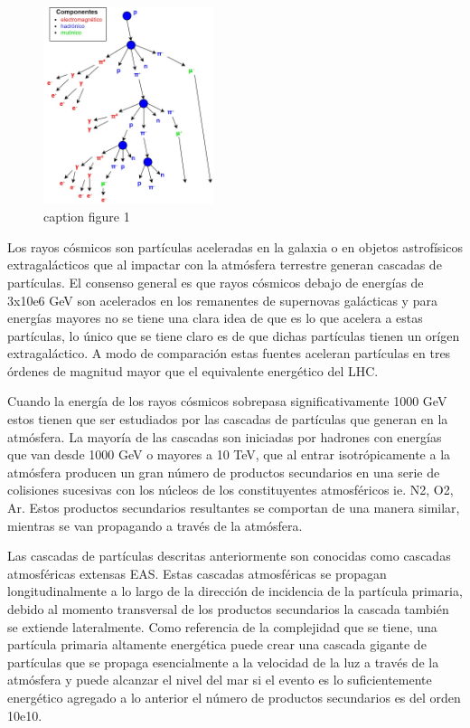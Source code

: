 \begin{figure}
    \centering
    \includegraphics[width=50mm,scale=0.5]{Figures/showercomponents-jpg.jpg}
    \decoRule
    \caption[showercomponents]{caption figure 1}
    \label{fig:showercomponents}
\end{figure}

Los rayos cósmicos son partículas aceleradas en la galaxia o en objetos astrofísicos extragalácticos que al impactar con la atmósfera terrestre generan cascadas de partículas. El consenso general es que rayos cósmicos debajo de energías de 3x10e6 GeV son acelerados en los remanentes de supernovas galácticas y para energías mayores no se tiene una clara idea de que es lo que acelera a estas partículas, lo único que se tiene claro es de que dichas partículas tienen un orígen extragaláctico. A modo de comparación estas fuentes aceleran partículas en tres órdenes de magnitud mayor que el equivalente energético del LHC.

Cuando la energía de los rayos cósmicos sobrepasa significativamente 1000 GeV estos tienen que ser estudiados por las cascadas de partículas que generan en la atmósfera. La mayoría de las cascadas son iniciadas por hadrones con energías que van desde 1000  GeV o mayores a 10 TeV, que al entrar isotrópicamente a la atmósfera producen un gran número de productos secundarios en una serie de colisiones sucesivas con los núcleos de los constituyentes atmosféricos ie. N2, O2, Ar. Estos productos secundarios resultantes se comportan de una manera similar, mientras se van propagando a través de la atmósfera.

Las cascadas de partículas descritas anteriormente son conocidas como cascadas atmosféricas extensas EAS. Estas cascadas atmosféricas se propagan longitudinalmente a lo largo de la dirección de incidencia de la partícula primaria, debido al momento transversal de los productos secundarios la cascada también se extiende lateralmente. Como referencia de la complejidad que se tiene, una partícula primaria altamente energética puede crear una cascada gigante de partículas que se propaga esencialmente a la velocidad de la luz a través de la atmósfera y puede alcanzar el nivel del mar si el evento es lo suficientemente energético agregado a lo anterior el número de productos secundarios es del orden 10e10.

